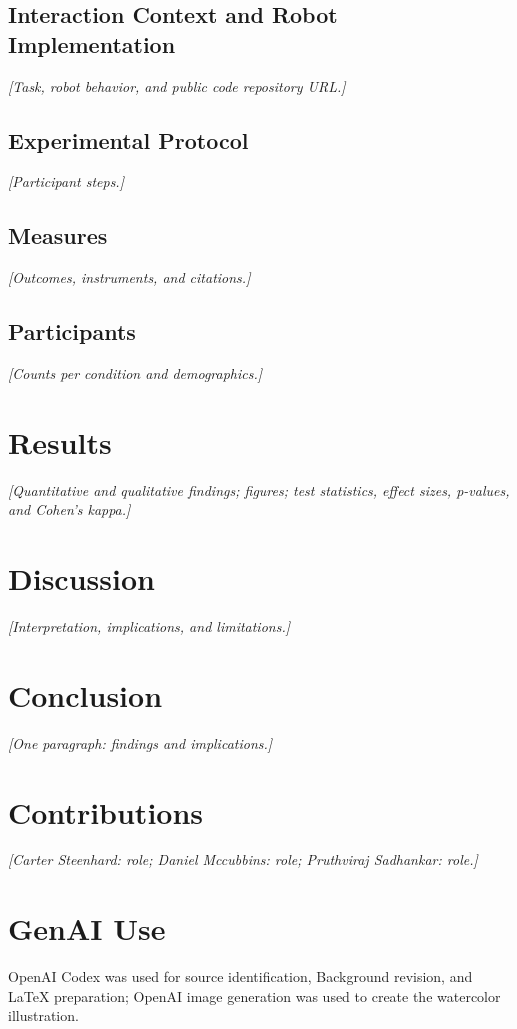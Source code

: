 \documentclass[sigconf,nonacm]{acmart}
\newcommand{\placeholder}[1]{\textit{[#1]}}
\newif\ifdraftspacing
\newcommand{\draftspace}[1]{\ifdraftspacing\par\vspace*{#1}\fi}
\newcommand{\draftpage}{\ifdraftspacing\clearpage\fi}
\begin{document}
\subsection{Interaction Context and Robot Implementation}
\placeholder{Task, robot behavior, and public code repository URL.}
\draftspace{25mm}
\draftpage

\subsection{Experimental Protocol}
\placeholder{Participant steps.}
\draftspace{40mm}

\subsection{Measures}
\placeholder{Outcomes, instruments, and citations.}
\draftspace{40mm}

\subsection{Participants}
\placeholder{Counts per condition and demographics.}
\draftspace{30mm}
\draftpage

\section{Results}
\label{sec:results}
\placeholder{Quantitative and qualitative findings; figures; test statistics,
effect sizes, p-values, and Cohen's kappa.}
\draftspace{120mm}
\draftpage

\section{Discussion}
\label{sec:discussion}
\placeholder{Interpretation, implications, and limitations.}
\draftspace{120mm}
\draftpage

\section{Conclusion}
\label{sec:conclusion}
\placeholder{One paragraph: findings and implications.}
\draftspace{40mm}

\section{Contributions}
\placeholder{Carter Steenhard: role; Daniel Mccubbins: role; Pruthviraj Sadhankar: role.}
\draftspace{40mm}

\section{GenAI Use}
OpenAI Codex was used for source identification, Background revision, and LaTeX preparation; OpenAI image generation was used to create the watercolor illustration.
\draftspace{20mm}
\draftpage



\end{document}
